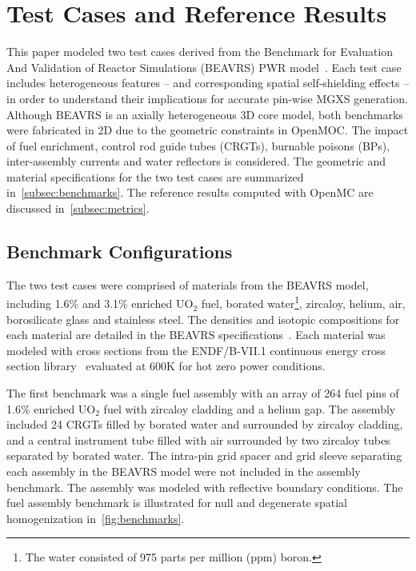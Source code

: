 \section{Test Cases and Reference Results}
\label{sec:test-cases}

This paper modeled two test cases derived from the Benchmark for Evaluation And Validation of Reactor Simulations (BEAVRS) PWR model~\citep{horelik2013beavrs}. Each test case includes heterogeneous features -- and corresponding spatial self-shielding effects -- in order to understand their implications for accurate pin-wise MGXS generation. Although BEAVRS is an axially heterogeneous 3D core model, both benchmarks were fabricated in 2D due to the geometric constraints in OpenMOC. The impact of fuel enrichment, control rod guide tubes (CRGTs), burnable poisons (BPs), inter-assembly currents and water reflectors is considered. The geometric and material specifications for the two test cases are summarized in~\autoref{subsec:benchmarks}. The reference results computed with OpenMC are discussed in~\autoref{subsec:metrics}.


\subsection{Benchmark Configurations}
\label{subsec:benchmarks}

The two test cases were comprised of materials from the BEAVRS model, including 1.6\% and 3.1\% enriched UO$_2$ fuel, borated water\footnote{The water consisted of 975 parts per million (ppm) boron.}, zircaloy, helium, air, borosilicate glass and stainless steel. The densities and isotopic compositions for each material are detailed in the BEAVRS specifications~\citep{horelik2013beavrs}. Each material was modeled with cross sections from the ENDF/B-VII.1 continuous energy cross section library~\citep{mcnpx2003manual} evaluated at 600K for hot zero power conditions.

The first benchmark was a single fuel assembly with an array of 264 fuel pins of 1.6\% enriched UO$_2$ fuel with zircaloy cladding and a helium gap. The assembly included 24 CRGTs filled by borated water and surrounded by zircaloy cladding, and a central instrument tube filled with air surrounded by two zircaloy tubes separated by borated water. The intra-pin grid spacer and grid sleeve separating each assembly in the BEAVRS model were not included in the assembly benchmark. The assembly was modeled with reflective boundary conditions. The fuel assembly benchmark is illustrated for null and degenerate spatial homogenization in~\autoref{fig:benchmarks}.

